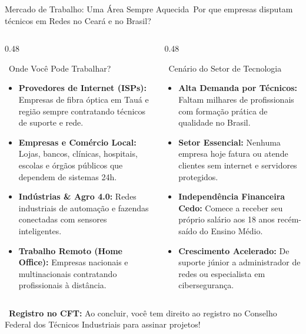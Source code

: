 
\begin{frame}{Mercado de Trabalho: Uma Área Sempre Aquecida}{\faBriefcase\ Por que empresas disputam técnicos em Redes no Ceará e no Brasil?}
  \begin{columns}[t]
    \begin{column}{0.48\textwidth}
      \begin{greencard}{\faCity\ Onde Você Pode Trabalhar?}
        \tiny
        \begin{itemize}\setlength{\itemsep}{0.18em}
          \item \textbf{Provedores de Internet (ISPs):} Empresas de fibra óptica em Tauá e região sempre contratando técnicos de suporte e rede.
          \item \textbf{Empresas e Comércio Local:} Lojas, bancos, clínicas, hospitais, escolas e órgãos públicos que dependem de sistemas 24h.
          \item \textbf{Indústrias \& Agro 4.0:} Redes industriais de automação e fazendas conectadas com sensores inteligentes.
          \item \textbf{Trabalho Remoto (Home Office):} Empresas nacionais e multinacionais contratando profissionais à distância.
        \end{itemize}
      \end{greencard}
    \end{column}
    
    \begin{column}{0.48\textwidth}
      \begin{bluecard}{\faChartLine\ Cenário do Setor de Tecnologia}
        \tiny
        \begin{itemize}\setlength{\itemsep}{0.18em}
          \item \textbf{Alta Demanda por Técnicos:} Faltam milhares de profissionais com formação prática de qualidade no Brasil.
          \item \textbf{Setor Essencial:} Nenhuma empresa hoje fatura ou atende clientes sem internet e servidores protegidos.
          \item \textbf{Independência Financeira Cedo:} Comece a receber seu próprio salário aos 18 anos recém-saído do Ensino Médio.
          \item \textbf{Crescimento Acelerado:} De suporte júnior a administrador de redes ou especialista em cibersegurança.
        \end{itemize}
      \end{bluecard}
    \end{column}
  \end{columns}
  
  \vspace{0.08cm}
  \begin{statcard}
    \tiny \textcolor{IFCEDarkGreen}{\faAward\ \textbf{Registro no CFT:} Ao concluir, você tem direito ao registro no Conselho Federal dos Técnicos Industriais para assinar projetos!}
  \end{statcard}
\end{frame}

